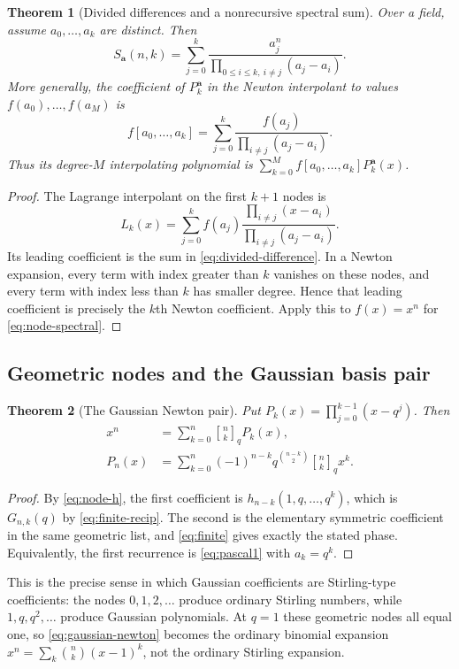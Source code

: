 \documentclass[11pt,a4paper]{article}
\numberwithin{equation}{section}
\newtheorem{theorem}{Theorem}[section]
\theoremstyle{definition}
\theoremstyle{remark}
\newcommand{\G}[2]{\genfrac{[}{]}{0pt}{}{#1}{#2}_{q}}
\begin{document}
\begin{theorem}[Divided differences and a nonrecursive spectral sum]
\label{thm:divdiff}
Over a field, assume $a_0,\ldots,a_k$ are distinct. Then
\begin{equation}
 S_{\boldsymbol a}(n,k)
 =\sum_{j=0}^k\frac{a_j^n}{\prod_{0\le i\le k,\ i\ne j}(a_j-a_i)}.
 \label{eq:node-spectral}
\end{equation}
More generally, the coefficient of $P_k^{\boldsymbol a}$ in the Newton
interpolant to values $f(a_0),\ldots,f(a_M)$ is
\begin{equation}
 f[a_0,\ldots,a_k]
 =\sum_{j=0}^k\frac{f(a_j)}{\prod_{i\ne j}(a_j-a_i)}.
 \label{eq:divided-difference}
\end{equation}
Thus its degree-$M$ interpolating polynomial is
$\sum_{k=0}^Mf[a_0,\ldots,a_k]P_k^{\boldsymbol a}(x)$.
\end{theorem}
\begin{proof}
The Lagrange interpolant on the first $k+1$ nodes is
\[
 L_k(x)=\sum_{j=0}^kf(a_j)
 \frac{\prod_{i\ne j}(x-a_i)}{\prod_{i\ne j}(a_j-a_i)}.
\]
Its leading coefficient is the sum in \cref{eq:divided-difference}.
In a Newton expansion, every term with index greater than $k$ vanishes
on these nodes, and every term with index less than $k$ has smaller
degree. Hence that leading coefficient is precisely the $k$th Newton
coefficient. Apply this to $f(x)=x^n$ for \cref{eq:node-spectral}.
\end{proof}

\subsection{Geometric nodes and the Gaussian basis pair}
\begin{theorem}[The Gaussian Newton pair]
\label{thm:gaussian-newton}
Put $P_k(x)=\prod_{j=0}^{k-1}(x-q^j)$. Then
\begin{align}
 x^n&=\sum_{k=0}^n\G nk P_k(x),
 \label{eq:gaussian-newton}\\
 P_n(x)&=\sum_{k=0}^n(-1)^{n-k}q^{\binom{n-k}2}\G nk x^k.
 \label{eq:gaussian-newton-inverse}
\end{align}
\end{theorem}
\begin{proof}
By \cref{eq:node-h}, the first coefficient is
$h_{n-k}(1,q,\ldots,q^k)$, which is $G_{n,k}(q)$ by
\cref{eq:finite-recip}. The second is the elementary symmetric
coefficient in the same geometric list, and \cref{eq:finite} gives
exactly the stated phase. Equivalently, the first recurrence is
\cref{eq:pascal1} with $a_k=q^k$.
\end{proof}
This is the precise sense in which Gaussian coefficients are
Stirling-type coefficients: the nodes $0,1,2,\ldots$ produce ordinary
Stirling numbers, while $1,q,q^2,\ldots$ produce Gaussian polynomials.
At $q=1$ these geometric nodes all equal one, so
\cref{eq:gaussian-newton} becomes the ordinary binomial expansion
$x^n=\sum_k\binom nk(x-1)^k$, not the ordinary Stirling expansion.
\end{document}
